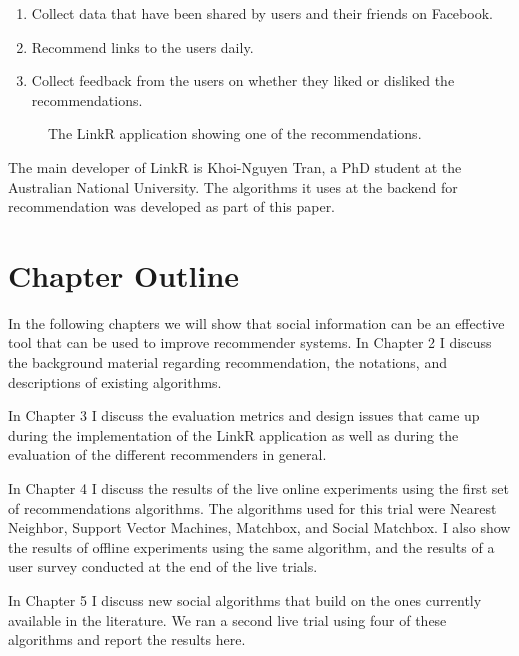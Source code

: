 \begin{enumerate}
\item{Collect data that have been shared by users and their friends on Facebook.}
\item{Recommend links to the users daily.}
\item{Collect feedback from the users on whether they liked or disliked the recommendations.}
\end{enumerate}

\begin{figure}[h]
\centering
{}
\caption{The LinkR application showing one of the recommendations.}
\end{figure}

The main developer of LinkR is Khoi-Nguyen Tran, a PhD student at the Australian National University. The algorithms it uses at the backend for recommendation was developed as part of this paper. 


\section{Chapter Outline}

In the following chapters we will show that social information can be an effective tool that can be used to improve recommender systems. In Chapter 2 I  discuss the background material regarding recommendation, the notations, and descriptions of existing algorithms. 

In Chapter 3 I discuss the evaluation metrics and design issues that came up during the implementation of the LinkR application as well as during the evaluation of the different recommenders in general.

In Chapter 4  I discuss the results of the live online experiments using the first set of recommendations algorithms. The algorithms used for this trial were Nearest Neighbor, Support Vector Machines, Matchbox, and Social Matchbox. I also show the results of offline experiments using the same algorithm, and the results of a user survey conducted at the end of the live trials.

In Chapter 5 I discuss new social algorithms that build on the ones currently available in the literature. We ran a second live trial using four of these algorithms and report the results here. 


